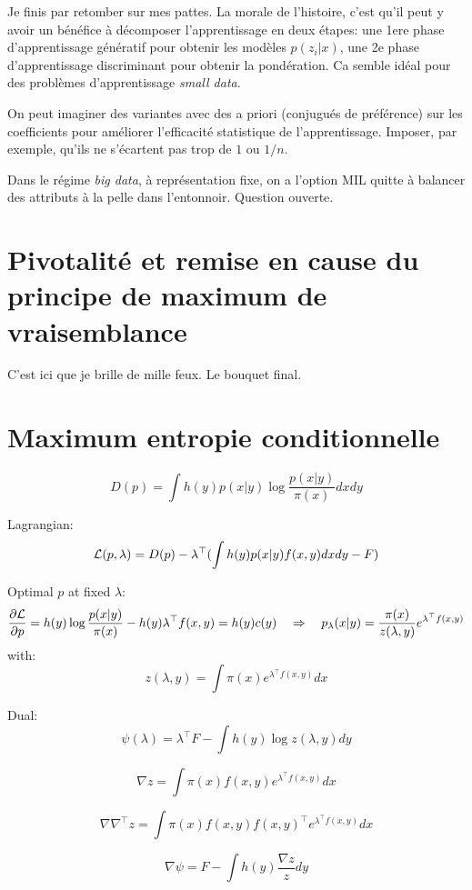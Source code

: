 \documentclass{article}
\begin{document}
Je finis par retomber sur mes pattes. La morale de l'histoire, c'est qu'il peut y avoir un b\'en\'efice \`a  d\'ecomposer l'apprentissage en deux \'etapes: une 1ere phase d'apprentissage g\'en\'eratif pour obtenir les mod\`eles $p(z_i|x)$, une 2e phase d'apprentissage discriminant pour obtenir la pond\'eration. Ca semble id\'eal pour des probl\`emes d'apprentissage {\em small data}. 

On peut imaginer des variantes avec des a priori (conjugu\'es de pr\'ef\'erence) sur les coefficients pour am\'eliorer l'efficacit\'e statistique de l'apprentissage. Imposer, par exemple, qu'ils ne s'\'ecartent pas trop de $1$ ou $1/n$. 

Dans le r\'egime {\em big data}, \`a repr\'esentation fixe, on a l'option MIL quitte \`a balancer des attributs \`a la pelle dans l'entonnoir. Question ouverte. 




\section{Pivotalit\'e et remise en cause du principe de maximum de vraisemblance}

C'est ici que je brille de mille feux. Le bouquet final.


\section{Maximum entropie conditionnelle}

$$
D(p) = \int h(y)p(x|y) \log \frac{p(x|y)}{\pi(x)} dxdy
$$

Lagrangian:
$$
{\cal L}(p,\lambda) = D(p) -\lambda^\top (\int h(y)p(x|y)f(x,y)dxdy - F)
$$

Optimal $p$ at fixed $\lambda$:
$$
\frac{\partial{\cal L}}{\partial p}
=
h(y) \log \frac{p(x|y)}{\pi(x)} - h(y) \lambda^\top f(x,y)
= h(y) c(y)
\quad
\Rightarrow
\quad
p_{\lambda}(x|y) = \frac{\pi(x)}{z(\lambda,y)} e^{\lambda^\top f(x,y)}
$$
with:
$$
z(\lambda,y) = \int \pi(x) e^{\lambda^\top f(x,y)} dx
$$

Dual:
$$
\psi(\lambda) = \lambda^\top F - \int h(y) \log z(\lambda, y) dy 
$$

$$
\nabla z
=
\int \pi(x) f(x,y)  e^{\lambda^\top f(x,y)} dx
$$

$$
\nabla \nabla^\top z 
=
\int \pi(x) f(x,y) f(x,y)^\top e^{\lambda^\top f(x,y)} dx
$$

$$
\nabla\psi
= F - \int h(y) \frac{\nabla z}{z} dy
$$
\end{document}

